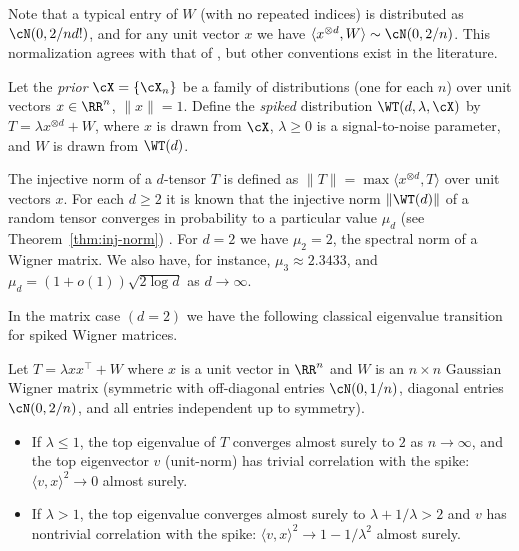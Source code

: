 \documentclass{article}
\begin{document}
\noindent Note that a typical entry of $W$ (with no repeated indices) is distributed as $\cN(0,2/nd!)$, and for any unit vector $x$ we have $\langle x^{\otimes d}, W \rangle \sim \cN(0,2/n)$. This normalization agrees with that of \cite{mrz}, but other conventions exist in the literature.

Let the \emph{prior} $\cX = \{\cX_n\}$ be a family of distributions (one for each $n$) over unit vectors $x \in \RR^n$, $\|x\|=1$. Define the \emph{spiked} distribution $\WT(d,\lambda,\cX)$ by $T = \lambda x^{\otimes d} + W$, where $x$ is drawn from $\cX$, $\lambda \ge 0$ is a signal-to-noise parameter, and $W$ is drawn from $\WT(d)$.

The injective norm of a $d$-tensor $T$ is defined as $\|T\| = \max \langle x^{\otimes d}, T \rangle$ over unit vectors $x$. For each $d \ge 2$ it is known that the injective norm $\|\WT(d)\|$ of a random tensor converges in probability to a particular value $\mu_d$ (see Theorem~\ref{thm:inj-norm}) \cite{cs92,tal06,abac,rm,subag-pspin}. For $d=2$ we have $\mu_2 = 2$, the spectral norm of a Wigner matrix. We also have, for instance, $\mu_3 \approx 2.3433$, and $\mu_d = (1+o(1)) \sqrt{2 \log d}$ as $d\to\infty$.

In the matrix case $(d=2)$ we have the following classical eigenvalue transition for spiked Wigner matrices.
\begin{theorem}
\label{thm:bbp-wig}
Let $T = \lambda x x^\top + W$ where $x$ is a unit vector in $\RR^n$ and $W$ is an $n \times n$ Gaussian Wigner matrix (symmetric with off-diagonal entries $\cN(0,1/n)$, diagonal entries $\cN(0,2/n)$, and all entries independent up to symmetry).
\begin{itemize}
\item If $\lambda \le 1$, the top eigenvalue of $T$ converges almost surely to $2$ as $n \to \infty$, and the top eigenvector $v$ (unit-norm) has trivial correlation with the spike: $\langle v,x \rangle^2 \to 0$ almost surely.
\item If $\lambda > 1$, the top eigenvalue converges almost surely to $\lambda + 1/\lambda > 2$ and $v$ has nontrivial correlation with the spike: $\langle v,x \rangle^2 \to 1 - 1/\lambda^2$ almost surely.
\end{itemize}
\end{theorem}
\end{document}
